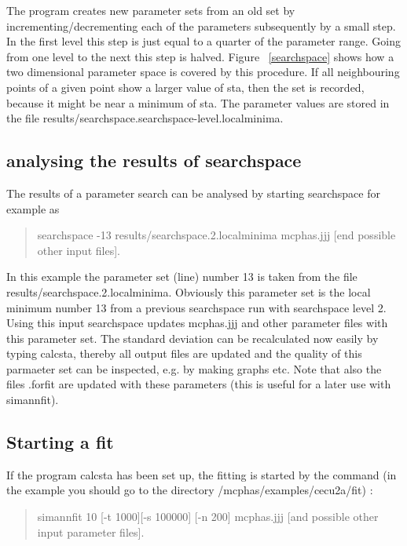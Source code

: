 The program creates new parameter sets from an old set by incrementing/decrementing
each of the parameters subsequently by a small step. In the first level this step
is just equal to a quarter of the parameter range. Going from one level to
 the next this step is halved. Figure ~\ref{searchspace} shows how a two dimensional
 parameter space is covered by this procedure. If all neighbouring points of
 a given point show a larger value of {\prg sta}, then the set is recorded, because it might be
 near a minimum of {\prg sta}. The parameter values are stored in the file
 {\prg results/searchspace.searchspace-level.localminima}.

\subsection{analysing the results of {\prg searchspace}}

The results of a parameter search can be analysed by starting searchspace for example as

\begin{quote}
{\prg searchspace -13 results/searchspace.2.localminima mcphas.jjj [end possible other input files]}.
\end{quote}

In this example the parameter set (line) number 13 is taken from the
 file {\prg results/searchspace.2.localminima}. Obviously this parameter set is the local minimum number 13
from a previous searchspace run with searchspace level 2. Using this input
 searchspace updates {\prg mcphas.jjj} and
other parameter files with this parameter set.
The standard deviation can be recalculated now easily by typing {\prg calcsta}, thereby all
output files are updated and the quality of this parmaeter set can be inspected, e.g. by
making graphs etc.
Note that also the files {\prg *.forfit} are updated with
these parameters (this is useful for a later use with {\prg simannfit}).

\subsection{Starting a fit}

If the program {\prg calcsta} has been set up, the fitting is started
by the command (in the example you should go to the directory {\prg /mcphas/examples/cecu2a/fit}) 
:

\begin{quote}
 {\prg simannfit 10 [-t 1000][-s 100000] [-n 200] mcphas.jjj [and possible other input parameter files]}.
\end{quote}

